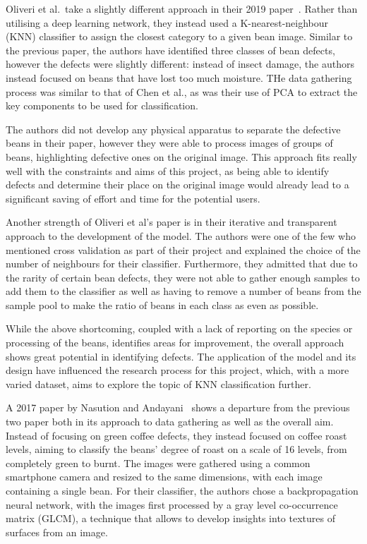 Oliveri et al.\  take a slightly different approach in their 2019 paper~\cite{hyperspectralGreenOliveri}. %
Rather than utilising a deep learning network, they instead used a K-nearest-neighbour
(KNN) classifier to assign the closest category to a given bean image.
Similar
to the previous paper, the authors have identified three classes of bean defects,
however the defects were slightly different: instead of insect damage, the
authors instead focused on beans that have lost too much moisture.
THe data gathering
process was similar to that of Chen et al., as was their use of PCA to extract the
key components to be used for classification.

The authors did not develop any physical apparatus to separate the defective beans
in their paper, however they were able to process images of groups of beans, highlighting
defective ones on the original image.
This approach fits really well with the
constraints and aims of this project, as being able to identify defects and determine
their place on the original image would already lead to a significant saving of effort
and time for the potential users.

Another strength of Oliveri et al's paper is in their iterative and transparent approach
to the development of the model.
The authors were one of the few who mentioned
cross validation as part of their project and explained the choice of the number
of neighbours for their classifier.
Furthermore, they admitted that due to the
rarity of certain bean defects, they were not able to gather enough samples to add
them to the classifier as well as having to remove a number of beans from the sample
pool to make the ratio of beans in each class as even as possible.

While the above shortcoming, coupled with a lack of reporting on the species or
processing of the beans, identifies areas for improvement, the overall approach
shows great potential in identifying defects.
The application of the model and its
design have influenced the research process for this project, which, with a more
varied dataset, aims to explore the topic of KNN classification further.

A 2017 paper by Nasution and Andayani~\cite{manyRoastLevelsNasution} shows a %
departure from the previous two paper both in its approach to data gathering as
well as the overall aim.
Instead of focusing on green coffee defects, they
instead focused on coffee roast levels, aiming to classify the beans' degree of
roast on a scale of 16 levels, from completely green to burnt.
The images were
gathered using a common smartphone camera and resized to the same dimensions, with
each image containing a single bean.
For their classifier, the authors chose a backpropagation
neural network, with the images first processed by a gray level co-occurrence
matrix (GLCM), a technique that allows to develop insights into textures of surfaces
from an image.

